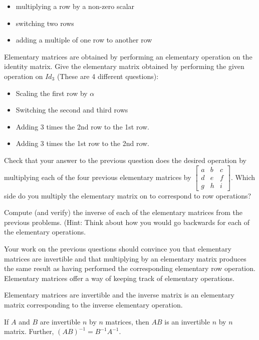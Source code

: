 \begin{itemize}
\item multiplying a row by a non-zero scalar
\item switching two rows
\item adding a multiple of one row to another row
\end{itemize}
Elementary matrices are obtained by performing an elementary operation on the identity matrix.
\bq Give the elementary matrix obtained by performing the given operation on $Id_3$ (These are 4 different questions):
\begin{itemize}
\item Scaling the first row by $\alpha$
\item Switching the second and third rows
\item Adding 3 times the 2nd row to the 1st row.
\item Adding 3 times the 1st row to the 2nd row.
\end{itemize}
\eq

\bq Check that your answer to the previous question does the desired operation by multiplying each of the four previous elementary matrices by $\begin{bmatrix} a&b&c\\d&e&f\\g&h&i \end{bmatrix}$. Which side do you multiply the elementary matrix on to correspond to row operations?
\eq

\bq Compute (and verify) the inverse of each of the elementary matrices from the previous problems. (Hint: Think about how you would go backwards for each of the elementary operations.
\eq

Your work on the previous questions should convince you that elementary matrices are invertible and that multiplying by an elementary matrix produces the same result as having performed the corresponding elementary row operation. Elementary matrices offer a way of keeping track of elementary operations.
\begin{theorem}
Elementary matrices are invertible and the inverse matrix is an elementary matrix corresponding to the inverse elementary operation.
\end{theorem}

\begin{theorem}
If $A$ and $B$ are invertible $n$ by $n$ matrices, then $AB$ is an invertible $n$ by $n$ matrix. Further, $(AB)^{-1} =B^{-1}A^{-1}$.
\end{theorem}

